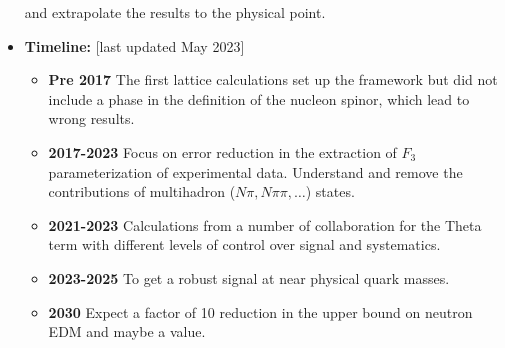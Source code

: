 \documentclass[12pt,hyperpdf]{article}
\begin{document}
\begin{itemize}
      and extrapolate the results to the physical point.
\item{\bf Timeline:} \hfill [last updated May 2023]
\begin{itemize}
    \item{\bf Pre 2017} The first lattice calculations set up the
      framework but did not include a phase in the definition of the
      nucleon spinor, which lead to wrong results.  
    \item{\bf 2017-2023} Focus on error reduction in the extraction of
      $F_3$ parameterization of experimental data. Understand and remove 
      the contributions of multihadron ($N\pi,
      N\pi\pi, \ldots$) states. 
    \item{\bf 2021-2023} Calculations from a number of collaboration for
      the Theta term with different levels of control over signal and
      systematics.  
    \item{\bf 2023-2025} To get a robust signal at near physical quark masses. 
    \item{\bf 2030} Expect a factor of 10 reduction in the upper bound on
      neutron EDM and maybe a value.  
\end{itemize}
\end{itemize}

\end{document}
